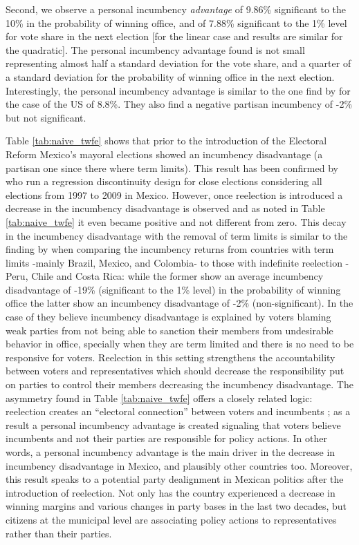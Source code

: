 \documentclass[12pt]{amsart}
\numberwithin{equation}{section}
\theoremstyle{definition}
\theoremstyle{definition}
\theoremstyle{definition}
\begin{document}
Second, we observe a personal incumbency \emph{advantage} of 9.86\% significant to the 10\% in the probability of winning office, and of 7.88\% significant to the 1\% level for vote share in the next election [for the linear case and results are similar for the quadratic]. The personal incumbency advantage found is not small representing almost half a standard deviation for the vote share, and a quarter of a standard deviation for the probability of winning office in the next election. Interestingly, the personal incumbency advantage is similar to the one find by \citet{fowler_hall_2014} for the case of the US of 8.8\%. They also find a negative partisan incumbency of -2\% but not significant.  

Table \ref{tab:naive_twfe} shows that prior to the introduction of the Electoral Reform Mexico's mayoral elections showed an incumbency disadvantage (a partisan one since there where term limits). This result has been confirmed by \citet{klasnja_titiunik_2017} who run a regression discontinuity design for close elections considering all elections from 1997 to 2009 in Mexico. However, once reelection is introduced a decrease in the incumbency disadvantage is observed and as noted in Table \ref{tab:naive_twfe} it even became positive and not different from zero. This decay in the incumbency disadvantage with the removal of term limits is similar to the finding by \citet{klasnja_titiunik_2017} when comparing the incumbency returns from countries with term limits -mainly Brazil, Mexico, and Colombia-  to those with indefinite reelection -Peru, Chile and Costa Rica: while the former show an average incumbency disadvantage of -19\% (significant to the 1\% level) in the probability of winning office the latter show an incumbency disadvantage of -2\% (non-significant). In the case of \citet{klasnja_titiunik_2017} they believe incumbency disadvantage is explained by voters blaming weak parties from not being able to sanction their members from undesirable behavior in office, specially when they are term limited and there is no need to be responsive for voters. Reelection in this setting strengthens the accountability between voters and representatives which should decrease the responsibility put on parties to control their members decreasing the incumbency disadvantage. The asymmetry found in Table \ref{tab:naive_twfe} offers a closely related logic: reelection creates an ``electoral connection'' between voters and incumbents \citep{mayhew_1974}; as a result a personal incumbency advantage is created signaling that voters believe incumbents and not their parties are responsible for policy actions. In other words, a personal incumbency advantage is the main driver in the decrease in incumbency disadvantage in Mexico, and plausibly other countries too. Moreover, this result speaks to a potential party dealignment in Mexican politics after the introduction of reelection. Not only has the country experienced a decrease in winning margins and various changes in party bases in the last two decades, but citizens at the municipal level are associating policy actions to representatives rather than their parties.   
\end{document}
